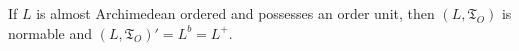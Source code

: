 If $L$ is almost Archimedean ordered and possesses an order unit, then $(L, \mathfrak{T}_O)$ is normable and $(L, \mathfrak{T}_O)' = L^b = L^+$.

